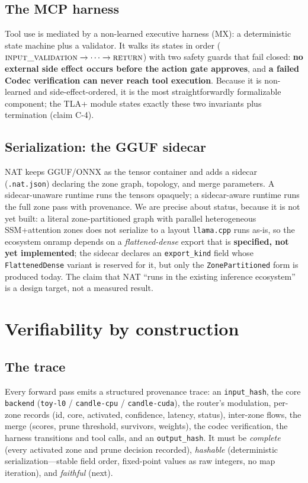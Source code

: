 \documentclass[11pt]{article}
\newcommand{\zone}[1]{\textsc{#1}}
\begin{document}
\subsection{The MCP harness}
Tool use is mediated by a non-learned executive harness (\zone{MX}): a deterministic state machine plus
a validator. It walks its states in order ($\textsc{input\_validation}\to\cdots\to\textsc{return}$)
with two safety guards that fail closed: \textbf{no external side effect occurs before the action gate
approves}, and \textbf{a failed Codec verification can never reach tool execution}. Because it is
non-learned and side-effect-ordered, it is the most straightforwardly formalizable component; the
TLA+ module states exactly these two invariants plus termination (claim C-4).

\subsection{Serialization: the GGUF sidecar}
NAT keeps GGUF/ONNX as the tensor container and adds a sidecar (\texttt{.nat.json}) declaring the zone
graph, topology, and merge parameters. A sidecar-unaware runtime runs the tensors opaquely; a
sidecar-aware runtime runs the full zone pass with provenance. We are precise about status, because it
is not yet built: a literal zone-partitioned graph with parallel heterogeneous SSM+attention zones
does not serialize to a layout \texttt{llama.cpp} runs as-is, so the ecosystem onramp depends on a
\emph{flattened-dense} export that is \textbf{specified, not yet implemented}; the sidecar declares an
\texttt{export\_kind} field whose \texttt{FlattenedDense} variant is reserved for it, but only the
\texttt{ZonePartitioned} form is produced today. The claim that NAT ``runs in the existing inference
ecosystem'' is a design target, not a measured result.

\section{Verifiability by construction}\label{sec:verif}

\subsection{The trace}
Every forward pass emits a structured provenance trace: an \texttt{input\_hash}, the core
\texttt{backend} (\texttt{toy-l0} / \texttt{candle-cpu} / \texttt{candle-cuda}), the router's
modulation, per-zone records (id, core, activated, confidence, latency, status), inter-zone flows,
the merge (scores, prune threshold, survivors, weights), the codec verification, the harness
transitions and tool calls, and an \texttt{output\_hash}. It must be \emph{complete} (every activated
zone and prune decision recorded), \emph{hashable} (deterministic serialization---stable field order,
fixed-point values as raw integers, no map iteration), and \emph{faithful} (next).
\end{document}

